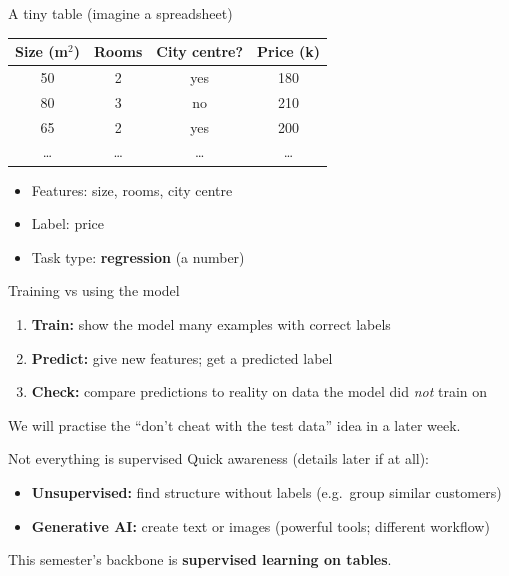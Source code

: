 \documentclass[aspectratio=169,11pt]{beamer}
\begin{document}
    \begin{frame}{A tiny table (imagine a spreadsheet)}
        \begin{center}
            \begin{tabular}{@{}cccc@{}}
                \toprule
                \textbf{Size (m$^2$)} & \textbf{Rooms} & \textbf{City centre?} & \textbf{Price (k)} \\
                \midrule
                50 & 2 & yes & 180 \\
                80 & 3 & no  & 210 \\
                65 & 2 & yes & 200 \\
                \ldots & \ldots & \ldots & \ldots \\
                \bottomrule
            \end{tabular}
        \end{center}
        \vspace{0.6em}
        \begin{itemize}
            \item Features: size, rooms, city centre
            \item Label: price
            \item Task type: \textbf{regression} (a number)
        \end{itemize}
    \end{frame}

    \begin{frame}{Training vs using the model}
        \begin{enumerate}
            \item \textbf{Train:} show the model many examples with correct labels
            \item \textbf{Predict:} give new features; get a predicted label
            \item \textbf{Check:} compare predictions to reality on data the model did \emph{not} train on
        \end{enumerate}
        \vspace{0.6em}
        We will practise the ``don't cheat with the test data'' idea in a later week.
    \end{frame}

    \begin{frame}{Not everything is supervised}
        Quick awareness (details later if at all):
        \begin{itemize}
            \item \textbf{Unsupervised:} find structure without labels (e.g.\ group similar customers)
            \item \textbf{Generative AI:} create text or images (powerful tools; different workflow)
        \end{itemize}
        \vspace{0.5em}
        This semester's backbone is \textbf{supervised learning on tables}.
    \end{frame}
\end{document}
